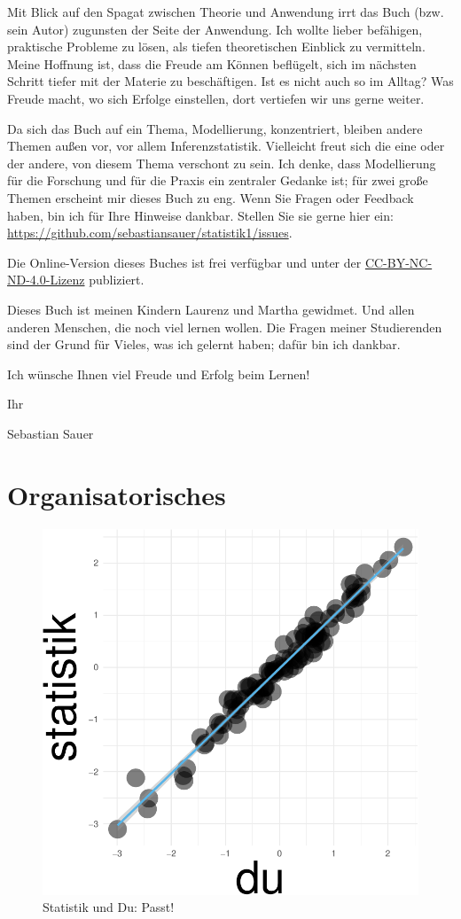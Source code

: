 \documentclass[
  letterpaper,
  oneside,
  open=any]{scrbook}
\theoremstyle{definition}
\theoremstyle{definition}
\theoremstyle{definition}
\theoremstyle{remark}
\begin{document}
Mit Blick auf den Spagat zwischen Theorie und Anwendung irrt das Buch
(bzw. sein Autor) zugunsten der Seite der Anwendung. Ich wollte lieber
befähigen, praktische Probleme zu lösen, als tiefen theoretischen
Einblick zu vermitteln. Meine Hoffnung ist, dass die Freude am Können
beflügelt, sich im nächsten Schritt tiefer mit der Materie zu
beschäftigen. Ist es nicht auch so im Alltag? Was Freude macht, wo sich
Erfolge einstellen, dort vertiefen wir uns gerne weiter.

Da sich das Buch auf ein Thema, Modellierung, konzentriert, bleiben
andere Themen außen vor, vor allem Inferenzstatistik. Vielleicht freut
sich die eine oder der andere, von diesem Thema verschont zu sein. Ich
denke, dass Modellierung für die Forschung und für die Praxis ein
zentraler Gedanke ist; für zwei große Themen erscheint mir dieses Buch
zu eng. Wenn Sie Fragen oder Feedback haben, bin ich für Ihre Hinweise
dankbar. Stellen Sie sie gerne hier ein:
\url{https://github.com/sebastiansauer/statistik1/issues}.

Die Online-Version dieses Buches ist frei verfügbar und unter der
\href{https://creativecommons.org/licenses/by-nc-nd/4.0/deed.de}{CC-BY-NC-ND-4.0-Lizenz}
publiziert.

Dieses Buch ist meinen Kindern Laurenz und Martha gewidmet. Und allen
anderen Menschen, die noch viel lernen wollen. Die Fragen meiner
Studierenden sind der Grund für Vieles, was ich gelernt haben; dafür bin
ich dankbar.

Ich wünsche Ihnen viel Freude und Erfolg beim Lernen!

Ihr

Sebastian Sauer

\clearpage 
\setcounter{tocdepth}{1}
\tableofcontents 


\chapter{Organisatorisches}\label{organisatorisches}

\begin{figure}[H]

{\centering \includegraphics[width=0.33\linewidth,height=\textheight,keepaspectratio]{005-orga_files/figure-pdf/statistik-und-du-guter-fit-1.pdf}

}

\caption{Statistik und Du: Passt!}

\end{figure}%
\end{document}
